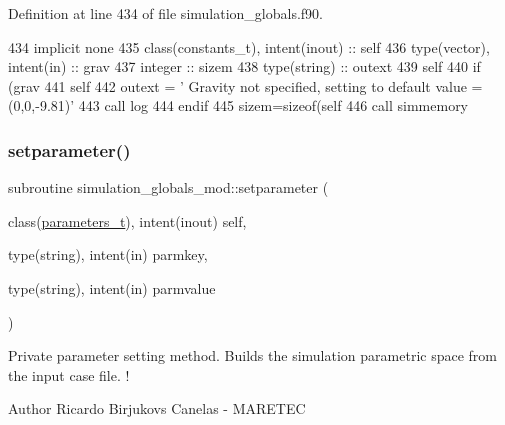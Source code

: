 Definition at line 434 of file simulation\+\_\+globals.\+f90.


\begin{DoxyCode}
434     \textcolor{keywordtype}{implicit none}
435     \textcolor{keywordtype}{class}(constants\_t), \textcolor{keywordtype}{intent(inout)} :: self
436     \textcolor{keywordtype}{type}(vector), \textcolor{keywordtype}{intent(in)} :: grav
437     \textcolor{keywordtype}{integer} :: sizem
438     \textcolor{keywordtype}{type}(string) :: outext
439     self%
440     \textcolor{keywordflow}{if} (grav%
441         self%
442         outext = \textcolor{stringliteral}{'       Gravity not specified, setting to default value = (0,0,-9.81)'}
443         \textcolor{keyword}{call }log%
444 \textcolor{keywordflow}{    endif}
445     sizem=sizeof(self%
446     \textcolor{keyword}{call }simmemory%
\end{DoxyCode}
\mbox{\label{namespacesimulation__globals__mod_a8a05831d4c3e3eb5741d65978f6fcf61}} 
\subsubsection{\texorpdfstring{setparameter()}{setparameter()}}
{\footnotesize\ttfamily subroutine simulation\+\_\+globals\+\_\+mod\+::setparameter (\begin{DoxyParamCaption}\item[{class(\mbox{\hyperlink{structsimulation__globals__mod_1_1parameters__t}{parameters\+\_\+t}}), intent(inout)}]{self,  }\item[{type(string), intent(in)}]{parmkey,  }\item[{type(string), intent(in)}]{parmvalue }\end{DoxyParamCaption})\hspace{0.3cm}{\ttfamily [private]}}



Private parameter setting method. Builds the simulation parametric space from the input case file. ! 

\begin{DoxyAuthor}{Author}
Ricardo Birjukovs Canelas -\/ M\+A\+R\+E\+T\+EC 
\end{DoxyAuthor}

